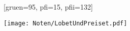 [gruen={95}, pfi={15}, pfii={132}]

\texttt{[image: Noten/LobetUndPreiset.pdf]}

\endsong

\beginscripture{}~\\
\endscripture

